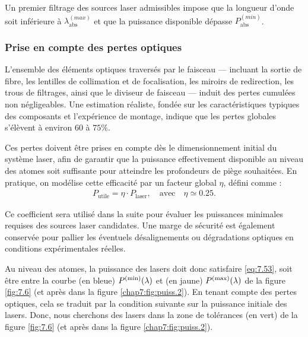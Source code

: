 Un premier filtrage des sources laser admissibles impose que la longueur d’onde soit inférieure à $\lambda^{(max)}_{\text{abs}}$ et que la puissance disponible dépasse $P^{(min)}_{\text{abs}}$.

%

\subsubsection*{Prise en compte des pertes optiques}

L’ensemble des éléments optiques traversés par le faisceau — incluant la sortie de fibre, les lentilles de collimation et de focalisation, les miroirs de redirection, les trous de filtrages, ainsi que le diviseur de faisceau — induit des pertes cumulées non négligeables. Une estimation réaliste, fondée sur les caractéristiques typiques des composants et l'expérience de montage, indique que les pertes globales s’élèvent à environ $60$ à $75\%$.

Ces pertes doivent être prises en compte dès le dimensionnement initial du système laser, afin de garantir que la puissance effectivement disponible au niveau des atomes soit suffisante pour atteindre les profondeurs de piège souhaitées. En pratique, on modélise cette efficacité par un facteur global $\eta$, défini comme :
\begin{eqnarray*}
	P_{\text{utile}} = \eta \cdot P_{\text{laser}}, \quad \text{avec} \quad \eta \simeq 0.25.	
\end{eqnarray*}

Ce coefficient sera utilisé dans la suite pour évaluer les puissances minimales requises des sources laser candidates. Une marge de sécurité est également conservée pour pallier les éventuels désalignements ou dégradations optiques en conditions expérimentales réelles.

\smallskip

Au niveau des atomes, la puissance des lasers doit donc satisfaire \eqref{eq:7.53}, soit être entre la courbe (en bleue) $P^{\rm (min)}(\lambda)$ et (en jaune) $P^{\rm (max)}(\lambda)$ de la figure \eqref{fig:7.6} (et après dans la figure \eqref{chap7:fig:puiss.2}). En tenant compte des pertes optiques, cela se traduit par la condition suivante sur la puissance initiale des lasers. Donc, nous cherchons des lasers dans la zone de tolérances (en vert) de la figure \eqref{fig:7.6} (et après dans la figure \eqref{chap7:fig:puiss.2}). 

